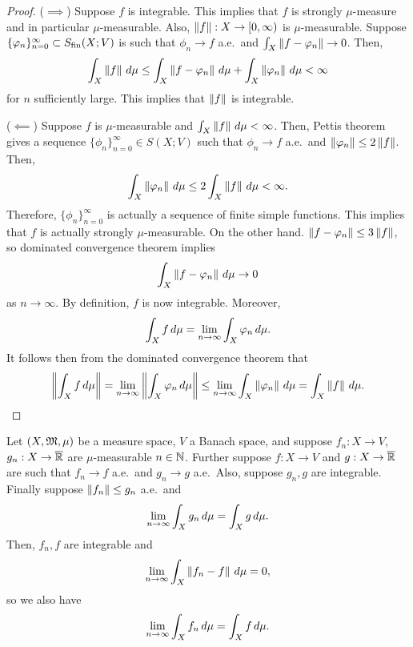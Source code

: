 \documentclass[a4paper]{article}
\renewcommand{\seqinfn}[1]{\{ #1 \}_{n=0}^\infty}
\begin{document}
\begin{proof}
  ($\implies$) Suppose $f$ is integrable. This implies that
  $f$ is strongly $\mu$-measure and in particular $\mu$-measurable.
  Also, $\left\lVert f\right\rVert : X \to [0, \infty)$ is $\mu$-measurable.
  Suppose $\seqinfn{\phi_n} \subset \Sfin(X; V)$ is such that
  $\phi_n \to f$ a.e.\ and $\int_X \left\lVert f - \varphi_n\right\rVert \to 0$.
  Then,
  \[
    \begin{aligned}
      \int_X \left\lVert f\right\rVert \, d \mu
      \leq \int_X \left\lVert f - \varphi_n\right\rVert \, d \mu + \int_X \left\lVert \varphi_n\right\rVert
      \, d \mu < \infty
    \end{aligned}
  \]
  for $n$ sufficiently large. This implies that $\left\lVert f\right\rVert$ is integrable.

  ($\impliedby$) Suppose $f$ is $\mu$-measurable and
  $\int_X \left\lVert f\right\rVert \, d \mu < \infty$. Then, Pettis theorem
  gives a sequence $\seqinfn{\phi_n} \in S(X; V)$ such that
  $\phi_n \to f$ a.e.\ and $\left\lVert \varphi_n\right\rVert \leq 2\left\lVert f\right\rVert$.
  Then,
  \[
    \int_X \left\lVert \varphi_n\right\rVert \, d \mu \leq 2 \int_X \left\lVert f\right\rVert \, d \mu
    < \infty.
  \]
  Therefore, $\seqinfn{\phi_n}$ is actually a sequence of finite simple
  functions. This implies that $f$ is actually strongly $\mu$-measurable.
  On the other hand. $\left\lVert f - \varphi_n\right\rVert \leq 3\left\lVert f\right\rVert$, so dominated
  convergence theorem implies
  \[
    \int_X \left\lVert f - \varphi_n\right\rVert \, d \mu \to 0
  \]
  as $n \to \infty$. By definition, $f$ is now integrable. Moreover,
  \[
    \int_X f \, d \mu = \lim_{n \to \infty} \int_X \varphi_n \, d \mu.
  \]
  It follows then from the dominated convergence theorem that
  \[
    \begin{aligned}
      \left\lVert \int_X f \, d \mu\right\rVert
      = \lim_{n \to \infty} \left\lVert \int_X \varphi_n \, d \mu\right\rVert
      \leq \lim_{n \to \infty} \int_X \left\lVert \varphi_n\right\rVert \, d \mu
      = \int_X \left\lVert f\right\rVert \, d \mu.
    \end{aligned}
  \]
\end{proof}

\begin{thm}
  Let $(X, \mathfrak{M}, \mu)$ be a measure space, $V$ a Banach space,
  and suppose $f_n : X \to V$, $g_n : X \to \overline{\mathbb{R}}$ are
  $\mu$-measurable $n \in \mathbb{N}$. Further suppose
  $f: X \to V$ and $g: X \to \overline{\mathbb{R}}$ are such that
  $f_n \to f$ a.e.\ and $g_n \to g$ a.e.\
  Also, suppose $g_n, g$ are integrable.
  Finally suppose
  $\left\lVert f_n\right\rVert \leq g_n$ a.e.\ and
  \[
    \lim_{n \to \infty} \int_X g_n \, d \mu = \int_X g \, d \mu.
  \]
  Then, $f_n, f$ are integrable and
  \[
    \lim_{n \to \infty} \int_X \left\lVert f_n - f\right\rVert \, d \mu = 0,
  \]
  so we also have
  \[
    \lim_{n \to \infty} \int_X f_n \, d \mu = \int_X f \, d \mu.
  \]
\end{thm}
\end{document}
